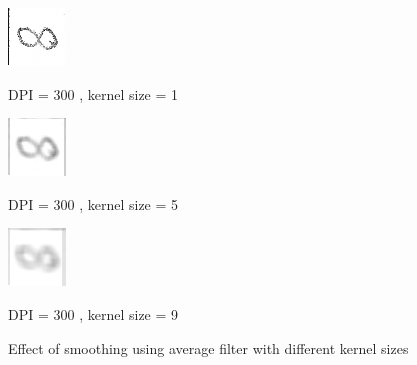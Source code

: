 \begin{figure}[H]
\vspace*{0.5cm} %
	\begin{minipage}[t]{0.30\textwidth}
		\centering
			\includegraphics[width=0.4\linewidth]{Figure/mikael_8_2_dpi300_k1.png}
			\caption{DPI = 300 , kernel size = 1}
			\label{fig:dpi_300_5}
	\end{minipage}
\hspace{\fill}	
	\begin{minipage}[t]{0.30\textwidth}
		\centering
			\includegraphics[width=0.4\linewidth]{Figure/mikael_8_2_dpi300_k5.png}
			\caption{DPI = 300 , kernel size = 5}
			\label{fig:dpi_300_9}
	\end{minipage}	
\hspace{\fill}	
	\begin{minipage}[t]{0.30\textwidth}
		\centering
			\includegraphics[width=0.4\linewidth]{Figure/mikael_8_2_dpi300_k9.png}
			\caption{DPI = 300 , kernel size = 9}
			\label{fig:dpi_300_9}
	\end{minipage}	
\caption{Effect of smoothing using average filter with different kernel sizes}
\label{fig:average_filter}
\end{figure}

